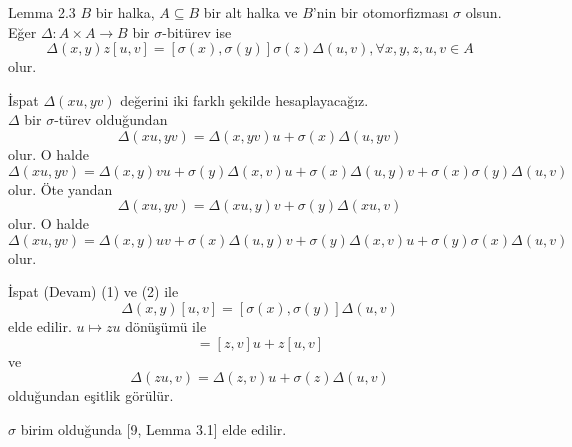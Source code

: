 \documentclass{beamer}
\begin{document}
\begin{frame}

\begin{block}{Lemma 2.3}
$B$ bir halka, $A \subseteq B$ bir alt halka ve $B$'nin bir otomorfizması $\sigma$ olsun. Eğer $\Delta \colon A \times A \to B$ bir $\sigma$-bitürev ise
\begin{equation*}
    \Delta(x,y)z[u,v] = [\sigma(x), \sigma(y)]\sigma(z)\Delta(u,v), \forall x,y,z,u,v \in A
\end{equation*}
olur.
\end{block}
    
\end{frame}

\begin{frame}
\footnotesize

\begin{block}{İspat}
$\Delta(xu,yv)$ değerini iki farklı şekilde hesaplayacağız.\\
$\Delta$ bir $\sigma$-türev olduğundan
\begin{equation*}
    \Delta(xu,yv) = \Delta(x,yv)u + \sigma(x)\Delta(u,yv)
\end{equation*}
olur. O halde
\begin{equation}
    \Delta(xu,yv) = \Delta(x,y)vu + \sigma(y)\Delta(x,v)u + \sigma(x)\Delta(u,y)v + \sigma(x)\sigma(y)\Delta(u,v)
\end{equation}
olur. Öte yandan
\begin{equation*}
    \Delta(xu,yv) = \Delta(xu,y)v + \sigma(y)\Delta(xu,v)
\end{equation*}
olur. O halde
\begin{equation}
    \Delta(xu,yv) = \Delta(x,y)uv + \sigma(x)\Delta(u,y)v + \sigma(y)\Delta(x,v)u + \sigma(y)\sigma(x)\Delta(u,v)
\end{equation}
olur.
\end{block}
    
\end{frame}

\begin{frame}
\footnotesize

\begin{block}{İspat (Devam)}
(1) ve (2) ile
\begin{equation*}
    \Delta(x,y)[u,v] = [\sigma(x),\sigma(y)]\Delta(u,v)
\end{equation*}
elde edilir. $u \mapsto zu$ dönüşümü ile
\begin{equation*}
    [zu,v] = [z,v]u + z[u,v]
\end{equation*}
ve
\begin{equation*}
    \Delta(zu,v) = \Delta(z,v)u + \sigma(z)\Delta(u,v)
\end{equation*}
olduğundan eşitlik görülür.
\end{block}

$\sigma$ birim olduğunda [9, Lemma 3.1] elde edilir.
    
\end{frame}
\end{document}
